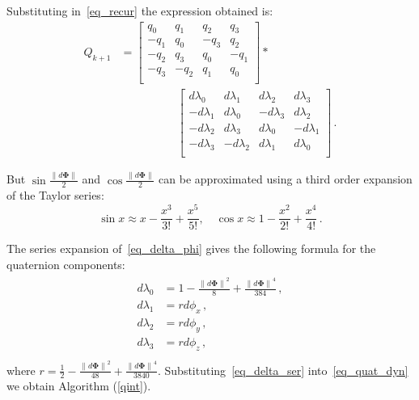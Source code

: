 \documentclass[journal]{IEEEtran}
\makeatletter
\newcommand{\mathleft}{\@fleqntrue\@mathmargin0pt}
\newcommand{\mathcenter}{\@fleqnfalse}
\makeatother
\begin{document}
Substituting in~\eqref{eq_recur} the expression obtained is:
\mathleft
\begin{equation}
\begin{split}
 {Q}_{k+1}&= \left[\begin{array}{rrrr}
         {q_0}&{q_1}&{q_2}&{q_3}\\
         -{q_1}&{q_0}&{-q_3}&{q_2}\\ 
         -{q_2}&{q_3}&{q_0}&{-q_1}\\
         -{q_3}&{-q_2}&{q_1}&{q_0}\\
    \end{array} \right]*\\
  & \qquad\qquad\quad \left[\begin{array}{rrrr}
         {d\lambda_0}&{d\lambda_1}&{d\lambda_2}&{d\lambda_3}\\
         -{d\lambda_1}&{d\lambda_0}&{-d\lambda_3}&{d\lambda_2}\\ 
         -{d\lambda_2}&{d\lambda_3}&{d\lambda_0}&{-d\lambda_1}\\
         -{d\lambda_3}&{-d\lambda_2}&{d\lambda_1}&{d\lambda_0}\\
    \end{array} \right]\,.
    \label{eq_quat_dyn}
    \end{split}
\end{equation}
\mathcenter


But $\sin\frac{{\|d\mathbf\Phi\|}}{2}$ and $\cos\frac{{\|d\mathbf\Phi\|}}{2}$ can be approximated using a third order expansion of the Taylor series:
\begin{equation}
    \sin{x} \approx x - \frac{x^3}{3!}+\frac{x^5}{5!},\quad 
     \cos{x} \approx 1 - \frac{x^2}{2!}+\frac{x^4}{4!}\,.
\end{equation}

The series expansion of~\eqref{eq_delta_phi} gives the following formula for the quaternion components:
\begin{equation}
         \begin{array}{c}
        \begin{aligned}
      
         d\lambda_0 &=1- \frac{{\|d\mathbf\Phi\|}^2}{8} + \frac{{\|d\mathbf\Phi\|}^4}{384}\,, \\
         
         d\lambda_1 &=r{{d\phi}_x}\,, \\
         
         d\lambda_2 &= r{{d\phi}_y}\,,\\
         
         d\lambda_3 &= r{{d\phi}_z}\,, \\
         \end{aligned}
        \end{array}
        \label{eq_delta_ser}
\end{equation}
where $r=\frac{1}{2}-\frac{{\|d\mathbf\Phi\|}^2}{48}+\frac{{\|d\mathbf\Phi\|}^4}{3840}$. Substituting~\eqref{eq_delta_ser} into~\eqref{eq_quat_dyn} we obtain Algorithm (\ref{qint}).
\end{document}
